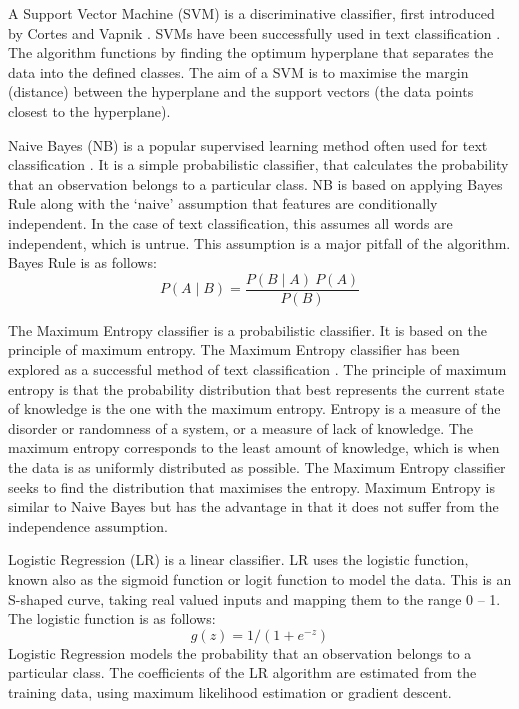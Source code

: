 A Support Vector Machine (SVM) is a discriminative classifier, first introduced by Cortes and Vapnik \cite{Vapnik1995,Vapnik21995}. SVMs have been successfully used in text classification \cite{Joachims1998}. The algorithm functions by finding the optimum hyperplane that separates the data into the defined classes. The aim of a SVM is to maximise the margin (distance) between the hyperplane and the support vectors (the data points closest to the hyperplane). 

Naive Bayes (NB) is a popular supervised learning method often used for text classification \cite{NaiveBayes1998}. It is a simple probabilistic classifier, that calculates the probability that an observation belongs to a particular class. NB is based on applying Bayes Rule along with the ‘naive’ assumption that features are conditionally independent. In the case of text classification, this assumes all words are independent, which is untrue. This assumption is a major pitfall of the algorithm. Bayes Rule is as follows:  \[P(A\mid B)=\frac{P(B\mid A)\:P(A)}{P(B)}\] 

The Maximum Entropy classifier is a probabilistic classifier. It is based on the principle of maximum entropy. The Maximum Entropy classifier has been explored as a successful method of text classification \cite{MaxEnt1999}. The principle of maximum entropy is that the probability distribution that best represents the current state of knowledge is the one with the maximum entropy. Entropy is a measure of the disorder or randomness of a system, or a measure of lack of knowledge. The maximum entropy corresponds to the least amount of knowledge, which is when the data is as uniformly distributed as possible. The Maximum Entropy classifier seeks to find the distribution that maximises the entropy. Maximum Entropy is similar to Naive Bayes but has the advantage in that it does not suffer from the independence assumption.

Logistic Regression (LR) is a linear classifier. LR uses the logistic function, known also as the sigmoid function or logit function to model the data. This is an S-shaped curve, taking real valued inputs and mapping them to the range 0 – 1. The logistic function is as follows: \[g(z)=1/(1+e^{-z})\]
Logistic Regression models the probability that an observation belongs to a particular class. The coefficients of the LR algorithm are estimated from the training data, using maximum likelihood estimation or gradient descent.


